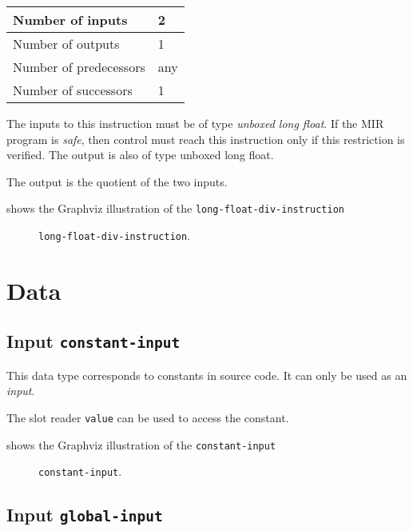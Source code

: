\begin{tabular}{|l|l|}
\hline
Number of inputs & 2\\
\hline
Number of outputs & 1\\
\hline
Number of predecessors & any\\
\hline
Number of successors & 1\\
\hline
\end{tabular}

The inputs to this instruction must be of type \emph{unboxed long
  float}.  If the MIR program is \emph{safe}, then control must reach
this instruction only if this restriction is verified.  The output is
also of type unboxed long float.

The output is the quotient of the two inputs.

 shows the Graphviz illustration of the
\texttt{long-float-div-instruction}

\begin{figure}
\begin{center}
\end{center}
\caption{\label{fig-long-float-div-instruction}
\texttt{long-float-div-instruction}.}
\end{figure}

\section{Data}

\subsection{Input \texttt{constant-input}}

This data type corresponds to constants in source code.  It can only
be used as an \emph{input}.

The slot reader \texttt{value} can be used to access the constant. 

 shows the Graphviz illustration of the
\texttt{constant-input}

\begin{figure}
\begin{center}
\end{center}
\caption{\label{fig-constant-input}
\texttt{constant-input}.}
\end{figure}

\subsection{Input \texttt{global-input}}

